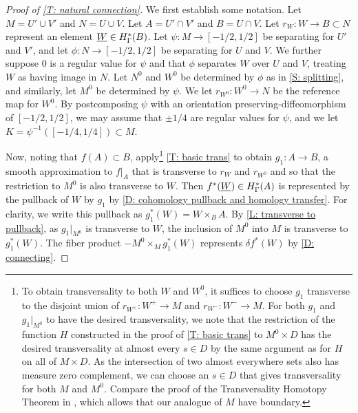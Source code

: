 \begin{proof}[Proof of \cref{T: natural connection}]
	We first establish some notation.
	Let $M = U' \cup V'$ and $N = U \cup V$.
	Let $A = U' \cap V'$ and $B = U \cap V$.
	Let $r_W \colon W \to B \subset N$ represent an element $\underline{W} \in H^*_\Gamma(B)$.
	Let $\psi \colon M \to [-1/2, 1/2]$ be separating for $U'$ and $V'$, and let $\phi \colon N \to [-1/2, 1/2]$ be separating for $U$ and $V$.
	We further suppose $0$ is a regular value for $\psi$ and that $\phi$ separates $W$ over $U$ and $V$, treating $W$ as having image in $N$.
	Let $N^0$ and $W^0$ be determined by $\phi$ as in \cref{S: splitting}, and similarly, let $M^0$ be determined by $\psi$.
	We let $r_{W^0} \colon W^0 \to N$ be the reference map for $W^0$.
	By postcomposing $\psi$ with an orientation preserving-diffeomorphism of $[-1/2, 1/2]$, we may assume that $\pm 1/4$ are regular values for $\psi$, and we let $K = \psi^{-1}([-1/4, 1/4]) \subset M$.

	Now, noting that $f(A) \subset B$, apply\footnote{To obtain transversality to both $W$ and $W^0$, it suffices to choose $g_1$ transverse to the disjoint union of $r_{W^+} \colon W^+ \to M$ and $r_{W^-} \colon W^- \to M$. For both $g_1$ and $g_1|_{M^0}$ to have the desired transversality, we note that the restriction of the function $H$ constructed in the proof of \cref{T: basic trans} to $M^0 \times D$ has the desired transversality at almost every $s \in D$ by the same argument as for $H$ on all of $M \times D$. As the intersection of two almost everywhere sets also has measure zero complement, we can choose an $s \in D$ that gives transversality for both $M$ and $M^0$. Compare the proof of the Transversality Homotopy Theorem in \cite{GuPo74}, which allows that our analogue of $M$ have boundary.} \cref{T: basic trans} to obtain $g_1 \colon A \to B$, a smooth approximation to $f|_A$ that is transverse to $r_W$ and $r_{W^0}$ and so that the restriction to $M^0$ is also transverse to $W$.
	Then $f^*(\underline{W}) \in H^*_\Gamma(A)$ is represented by the pullback of $W$ by $g_1$ by \cref{D: cohomology pullback and homology transfer}.
	For clarity, we write this pullback as $g_1^*(W) = W \times_B A$.
	By \cref{L: transverse to pullback}, as $g_1|_{M^0}$ is transverse to $W$, the inclusion of $M^0$ into $M$ is transverse to $g_1^*(W)$.
	The fiber product $ - M^0 \times_M g_1^*(W)$ represents $\delta f^* (W)$ by \cref{D: connecting}.

\begin{comment}
	Next, let $K' = \psi^{-1}([-3/8, 3/8]) \subset A \subset M$.
	We may assume that $\psi$ was chosen so that $\pm 3/8$ are also regular values.
\end{comment}


\end{proof}

